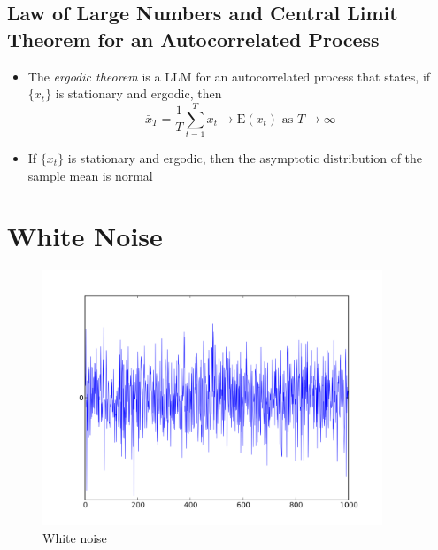 \documentclass[11pt]{article}
\begin{document}
\subsection{Law of Large Numbers and Central Limit Theorem for an Autocorrelated Process}
\begin{itemize}
    \item The \textit{ergodic theorem} is a LLM for an autocorrelated process that states, if 
    $\{x_t\}$ is stationary and ergodic, then 
    \[\bar{x}_T= \frac{1}{T} \sum_{t=1}^{T} x_t \rightarrow \text{E}(x_t) \text{ as } T 
    \rightarrow \infty\]
    \item If $\{x_t\}$ is stationary and ergodic, then the asymptotic distribution of the 
    sample mean is normal 
\end{itemize}

\section{White Noise}

\begin{figure}[H] 
    \centering 
    \includegraphics[width=4in]{imgs/white_noise.png}
    \caption{White noise}
\end{figure}
\end{document}
